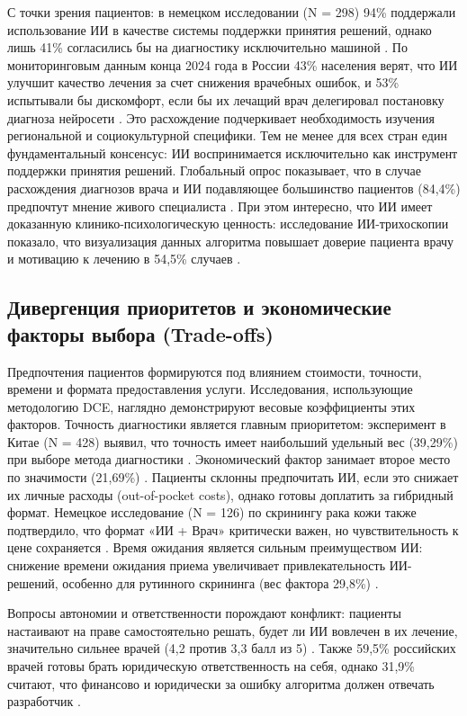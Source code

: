\documentclass[12pt, a4paper]{article}
\begin{document}
С точки зрения пациентов: в немецком исследовании (N = 298) 94\% поддержали использование ИИ в качестве системы поддержки принятия решений, однако лишь 41\% согласились бы на диагностику исключительно машиной \cite{Jutzi2020}. По мониторинговым данным конца 2024 года в России 43\% населения верят, что ИИ улучшит качество лечения за счет снижения врачебных ошибок, и 53\% испытывали бы дискомфорт, если бы их лечащий врач делегировал постановку диагноза нейросети \cite{VCIOM2024}. Это расхождение подчеркивает необходимость изучения региональной и социокультурной специфики. Тем не менее для всех стран един фундаментальный консенсус: ИИ воспринимается исключительно как инструмент поддержки принятия решений. Глобальный опрос показывает, что в случае расхождения диагнозов врача и ИИ подавляющее большинство пациентов (84,4\%) предпочтут мнение живого специалиста \cite{Wu2024}. При этом интересно, что ИИ имеет доказанную клинико-психологическую ценность: исследование ИИ-трихоскопии показало, что визуализация данных алгоритма повышает доверие пациента врачу и мотивацию к лечению в 54,5\% случаев \cite{Kearney2025}.

\subsection{Дивергенция приоритетов и экономические факторы выбора (Trade-offs)}
Предпочтения пациентов формируются под влиянием стоимости, точности, времени и формата предоставления услуги. Исследования, использующие методологию DCE, наглядно демонстрируют весовые коэффициенты этих факторов. Точность диагностики является главным приоритетом: эксперимент в Китае (N = 428) выявил, что точность имеет наибольший удельный вес (39,29\%) при выборе метода диагностики \cite{Liu2021}. Экономический фактор занимает второе место по значимости (21,69\%) \cite{Liu2021}. Пациенты склонны предпочитать ИИ, если это снижает их личные расходы (out-of-pocket costs), однако готовы доплатить за гибридный формат. Немецкое исследование (N = 126) по скринингу рака кожи также подтвердило, что формат «ИИ + Врач» критически важен, но чувствительность к цене сохраняется \cite{Jagemann2024}. Время ожидания является сильным преимуществом ИИ: снижение времени ожидания приема увеличивает привлекательность ИИ-решений, особенно для рутинного скрининга (вес фактора 29,8\%) \cite{Jagemann2024, Liu2021}.

Вопросы автономии и ответственности порождают конфликт: пациенты настаивают на праве самостоятельно решать, будет ли ИИ вовлечен в их лечение, значительно сильнее врачей (4,2 против 3,3 балл из 5) \cite{Garcia2025}. Также 59,5\% российских врачей готовы брать юридическую ответственность на себя, однако 31,9\% считают, что финансово и юридически за ошибку алгоритма должен отвечать разработчик \cite{Orlova2023}.
\end{document}
